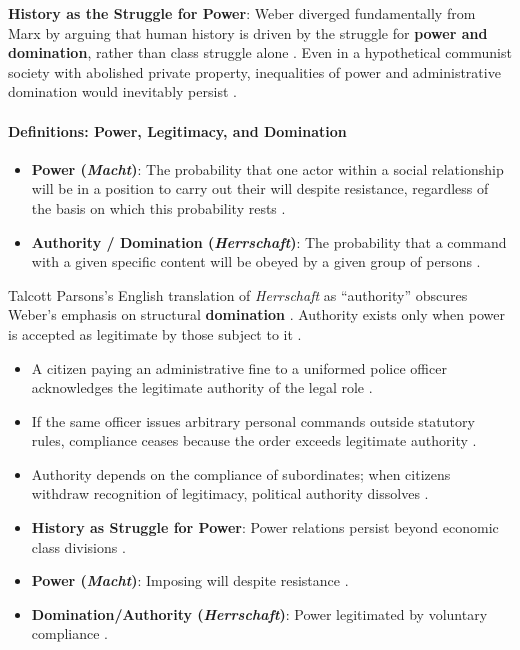 \begin{KeyConcept}
\textbf{History as the Struggle for Power}:
Weber diverged fundamentally from Marx by arguing that human history is driven by the struggle for \textbf{power and domination}, rather than class struggle alone . Even in a hypothetical communist society with abolished private property, inequalities of power and administrative domination would inevitably persist .
\end{KeyConcept}

\paragraph{Definitions: Power, Legitimacy, and Domination}
\begin{itemize}
    \item \textbf{Power (\textit{Macht})}: The probability that one actor within a social relationship will be in a position to carry out their will despite resistance, regardless of the basis on which this probability rests .
    \item \textbf{Authority / Domination (\textit{Herrschaft})}: The probability that a command with a given specific content will be obeyed by a given group of persons .
\end{itemize}

\begin{CriticalPoint}
Talcott Parsons's English translation of \textit{Herrschaft} as ``authority'' obscures Weber's emphasis on structural \textbf{domination} . Authority exists only when power is accepted as legitimate by those subject to it .
\end{CriticalPoint}

\begin{ExampleBox}
\begin{itemize}
    \item A citizen paying an administrative fine to a uniformed police officer acknowledges the legitimate authority of the legal role .
    \item If the same officer issues arbitrary personal commands outside statutory rules, compliance ceases because the order exceeds legitimate authority .
    \item Authority depends on the compliance of subordinates; when citizens withdraw recognition of legitimacy, political authority dissolves .
\end{itemize}
\end{ExampleBox}

\begin{QuickRevision}
\begin{itemize}
    \item \textbf{History as Struggle for Power}: Power relations persist beyond economic class divisions .
    \item \textbf{Power (\textit{Macht})}: Imposing will despite resistance .
    \item \textbf{Domination/Authority (\textit{Herrschaft})}: Power legitimated by voluntary compliance .
\end{itemize}
\end{QuickRevision}

